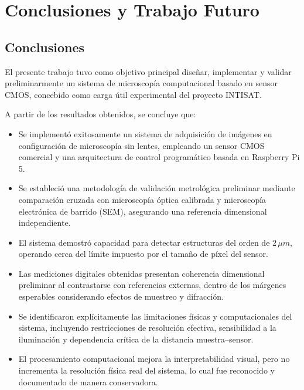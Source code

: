 \chapter{Conclusiones y Trabajo Futuro}

\section{Conclusiones}

El presente trabajo tuvo como objetivo principal diseñar, implementar y validar preliminarmente un sistema de microscopía computacional basado en sensor CMOS, concebido como carga útil experimental del proyecto INTISAT.

A partir de los resultados obtenidos, se concluye que:

\begin{itemize}
    \item Se implementó exitosamente un sistema de adquisición de imágenes en configuración de microscopía sin lentes, empleando un sensor CMOS comercial y una arquitectura de control programático basada en Raspberry Pi 5.

    \item Se estableció una metodología de validación metrológica preliminar mediante comparación cruzada con microscopía óptica calibrada y microscopía electrónica de barrido (SEM), asegurando una referencia dimensional independiente.

    \item El sistema demostró capacidad para detectar estructuras del orden de $2\,\mu m$, operando cerca del límite impuesto por el tamaño de píxel del sensor.

    \item Las mediciones digitales obtenidas presentan coherencia dimensional preliminar al contrastarse con referencias externas, dentro de los márgenes esperables considerando efectos de muestreo y difracción.

    \item Se identificaron explícitamente las limitaciones físicas y computacionales del sistema, incluyendo restricciones de resolución efectiva, sensibilidad a la iluminación y dependencia crítica de la distancia muestra–sensor.

    \item El procesamiento computacional mejora la interpretabilidad visual, pero no incrementa la resolución física real del sistema, lo cual fue reconocido y documentado de manera conservadora.
\end{itemize}

